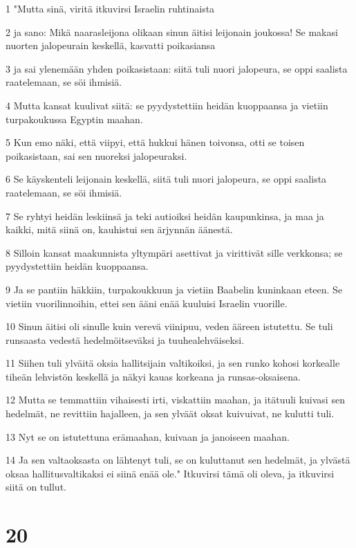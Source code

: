 \par 1 "Mutta sinä, viritä itkuvirsi Israelin ruhtinaista
\par 2 ja sano: Mikä naarasleijona olikaan sinun äitisi leijonain joukossa! Se makasi nuorten jalopeurain keskellä, kasvatti poikasiansa
\par 3 ja sai ylenemään yhden poikasistaan: siitä tuli nuori jalopeura, se oppi saalista raatelemaan, se söi ihmisiä.
\par 4 Mutta kansat kuulivat siitä: se pyydystettiin heidän kuoppaansa ja vietiin turpakoukussa Egyptin maahan.
\par 5 Kun emo näki, että viipyi, että hukkui hänen toivonsa, otti se toisen poikasistaan, sai sen nuoreksi jalopeuraksi.
\par 6 Se käyskenteli leijonain keskellä, siitä tuli nuori jalopeura, se oppi saalista raatelemaan, se söi ihmisiä.
\par 7 Se ryhtyi heidän leskiinsä ja teki autioiksi heidän kaupunkinsa, ja maa ja kaikki, mitä siinä on, kauhistui sen ärjynnän äänestä.
\par 8 Silloin kansat maakunnista yltympäri asettivat ja virittivät sille verkkonsa; se pyydystettiin heidän kuoppaansa.
\par 9 Ja se pantiin häkkiin, turpakoukkuun ja vietiin Baabelin kuninkaan eteen. Se vietiin vuorilinnoihin, ettei sen ääni enää kuuluisi Israelin vuorille.
\par 10 Sinun äitisi oli sinulle kuin verevä viinipuu, veden ääreen istutettu. Se tuli runsaasta vedestä hedelmöitseväksi ja tuuhealehväiseksi.
\par 11 Siihen tuli ylväitä oksia hallitsijain valtikoiksi, ja sen runko kohosi korkealle tiheän lehvistön keskellä ja näkyi kauas korkeana ja runsas-oksaisena.
\par 12 Mutta se temmattiin vihaisesti irti, viskattiin maahan, ja itätuuli kuivasi sen hedelmät, ne revittiin hajalleen, ja sen ylväät oksat kuivuivat, ne kulutti tuli.
\par 13 Nyt se on istutettuna erämaahan, kuivaan ja janoiseen maahan.
\par 14 Ja sen valtaoksasta on lähtenyt tuli, se on kuluttanut sen hedelmät, ja ylvästä oksaa hallitusvaltikaksi ei siinä enää ole." Itkuvirsi tämä oli oleva, ja itkuvirsi siitä on tullut.

\chapter{20}

